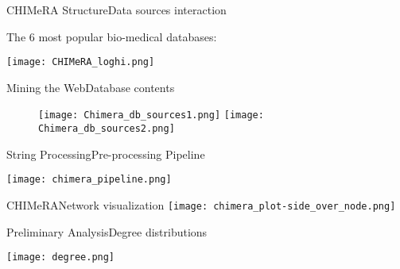 \documentclass{standalone}
\begin{document}
\begin{frame}{CHIMeRA Structure}{Data sources interaction}

  \centering The 6 most popular bio-medical databases:

  \centering\texttt{[image: CHIMeRA\_loghi.png]}

\end{frame}


\begin{frame}{Mining the Web}{Database contents}

  \begin{figure}
    \begin{overprint}
      \centering\texttt{[image: Chimera\_db\_sources1.png]}
      \centering\texttt{[image: Chimera\_db\_sources2.png]}
    \end{overprint}
  \end{figure}

\end{frame}



\begin{frame}{String Processing}{Pre-processing Pipeline}

  \centering\texttt{[image: chimera\_pipeline.png]}

\end{frame}


\begin{frame}{CHIMeRA}{Network visualization}
  \centering\texttt{[image: chimera\_plot-side\_over\_node.png]}
\end{frame}


\begin{frame}{Preliminary Analysis}{Degree distributions}

  \centering\texttt{[image: degree.png]}

\end{frame}
\end{document}
